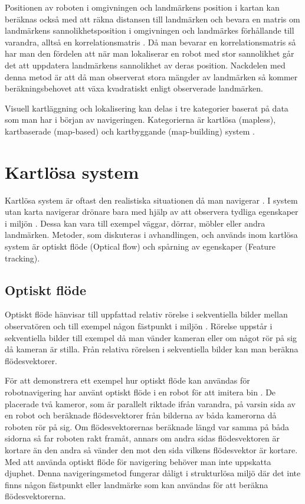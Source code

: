Positionen av roboten i omgivningen och landmärkens position i kartan kan beräknas också med att räkna distansen till landmärken och bevara en matris om landmärkens sannolikhetsposition i omgivningen och landmärkes förhållande till varandra, alltså en korrelationsmatris \citep{realslamproblem, ProbabilisticRobotics}. Då man bevarar en korrelationsmatris så har man den fördelen att när man lokaliserar en robot med stor sannolikhet går det att uppdatera landmärkens sannolikhet av deras position. Nackdelen med denna metod är att då man observerat stora mängder av landmärken så kommer beräkningsbehovet att växa kvadratiskt enligt observerade landmärken. 

Visuell kartläggning och lokalisering kan delas i tre kategorier baserat på data som man har i början av navigeringen. Kategorierna är kartlösa (mapless), kartbaserade (map-based) och kartbyggande (map-building) system \citep{geospatial}. 

\section{Kartlösa system}

Kartlösa system är oftast den realistiska situationen då man navigerar \citep{ProbabilisticRobotics}. I system utan karta navigerar drönare bara med hjälp av att observera tydliga egenskaper i miljön \citep{982903}. Dessa kan vara till exempel väggar, dörrar, möbler eller andra landmärken. Metoder, som diskuteras i avhandlingen, och används inom kartlösa system är optiskt flöde (Optical flow) och spårning av egenskaper (Feature tracking). 

\subsection{Optiskt flöde}

Optiskt flöde hänvisar till uppfattad relativ rörelse i sekventiella bilder mellan observatören och till exempel någon fästpunkt i miljön \citep{opticalflowuav}. Rörelse uppstår i sekventiella bilder till exempel då man vänder kameran eller om något rör på sig då kameran är stilla. Från relativa rörelsen i sekventiella bilder kan man beräkna flödesvektorer.

För att demonstrera ett exempel hur optiskt flöde kan användas för robotnavigering har \cite{341094} använt optiskt flöde i en robot för att imitera bin \citep{341094}. De placerade två kameror, som är parallelt riktade ifrån varandra, på varsin sida av en robot och beräknade flödesvektorer från bilderna av båda kamerorna då roboten rör på sig. Om flödesvektorernas beräknade längd var samma på båda sidorna så far roboten rakt framåt, annars om andra sidas flödesvektoren är kortare än den andra så vänder den mot den sida vilkens flödesvektor är kortare. Med att använda optiskt flöde för navigering behöver man inte uppskatta djuphet. Denna navigeringsmetod fungerar dåligt i strukturlösa miljö där det inte finns någon fästpunkt eller landmärke som kan användas för att beräkna flödesvektorerna. 

